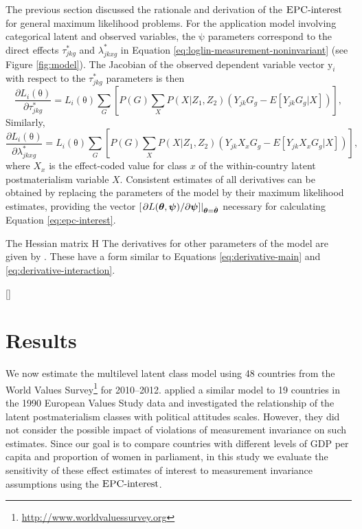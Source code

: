 \documentclass[letterpaper,12pt]{article}
\newcommand\vm[1]{%
\bm{\mathrm{#1}}}
\newcommand{\param}{\vm{\theta}}
\newcommand{\bpsi}{\vm{\psi}}
\newcommand{\that}{\hat{\vm{\theta}}}
\newcommand{\da}{\textrm{{\sc {EPC}}-interest}}
\begin{document}
The previous section discussed the rationale and derivation of the $\da{}$ for general maximum likelihood problems. For the application model involving categorical latent and observed variables, the $\bpsi$ parameters correspond to the direct effects $\tau^*_{jkg}$ and $\lambda^*_{jkxg}$ in Equation \ref{eq:loglin-measurement-noninvariant} (see Figure \ref{fig:model}). The Jacobian of the observed dependent variable vector $\vm{y}_i$ with respect to the $\tau^*_{jkg}$ parameters is then
\begin{equation}
	\frac{\partial L_i(\param) }{\partial \tau^*_{jkg}} = 
		L_i(\param) \sum_G \left[ P(G) \sum_X P(X|Z_1, Z_2) ( Y_{jk}G_g - E[ Y_{jk}G_g | X]) \right],
		\label{eq:derivative-main}
\end{equation}
Similarly,
\begin{equation}
	\frac{\partial L_i(\param) }{\partial \lambda^*_{jkxg}} = 
		L_i(\param) \sum_G \left[ P(G) \sum_X P(X|Z_1, Z_2) ( Y_{jk} X_x G_g  - E[ Y_{jk} X_x G_g | X]) \right],
		\label{eq:derivative-interaction}
\end{equation}
where $X_x$ is the effect-coded value for class $x$ of the within-country latent postmaterialism variable $X$.  Consistent estimates of all derivatives can be obtained by replacing the parameters of the model by their maximum likelihood estimates, providing the  vector $[ \left.\partial L(\param, \bpsi) / \partial \bpsi ] \right|_{\param = \that}$  necessary for calculating Equation \ref{eq:epc-interest}.


The Hessian matrix $\vm{H}$ 
The derivatives for other parameters of the model are given by  \citet{vermunt2013technical}. These have a form similar to Equations \ref{eq:derivative-main} and \ref{eq:derivative-interaction}. 

[]


\section{Results}


We now estimate the multilevel latent class model using 48 countries from the World Values Survey\footnote{\url{http://www.worldvaluessurvey.org}} for  2010--2012. \citet{moors2007heterogeneity} applied a similar model to 19 countries in the 1990 European Values Study data and investigated the relationship of the latent postmaterialism classes with political attitudes scales. However, they did not consider the possible impact of violations of measurement invariance on such estimates. Since our goal is to compare countries with different levels of GDP per capita and proportion of women in parliament, in this study we evaluate the sensitivity of these effect estimates of interest to measurement invariance assumptions using the $\da$.
\end{document}
